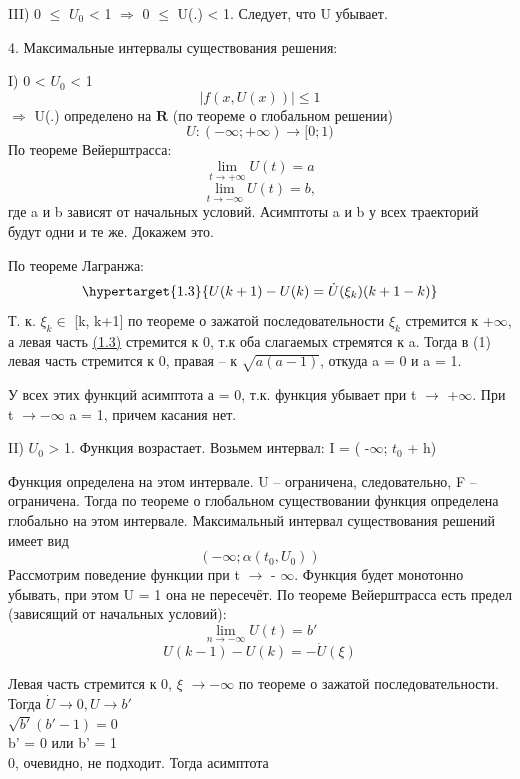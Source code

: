 \documentclass[10pt]{report}
\begin{document}
III) 0 $\leq$ $U_0$ < 1 $\Rightarrow$  0 $\leq$  U(.) < 1. Следует, что U убывает. \par

4. Максимальные интервалы существования решения:

I) 0 < $U_0$ < 1
\[ |f(x, U(x))|  \leq 1 \] $\Rightarrow$ U(.) определено на $\mathbf{R}$ (по теореме о глобальном решении)
\[ U : (-\infty; +\infty) \rightarrow [0;1) \]
По теореме Вейерштрасса:
\[
\lim_{t \to +\infty } U(t) = a
\]
\[
\lim_{t \to -\infty} U(t) = b,
\]
где a и b зависят от начальных условий. Асимптоты a и b у всех траекторий будут одни и те же. Докажем это.
\par
По теореме Лагранжа:
\begin{equation}
\hypertarget{1.3}{ U(k+1)-U(k) = \dot{U}(\xi_k)(k+1-k)}
\end{equation}
Т. к.  $\xi_k \in$ [k, k+1] по теореме о зажатой последовательности $\xi_k$ стремится к +$\infty$, а левая часть \hyperlink{1.3}{(1.3)} стремится к 0, т.к оба слагаемых стремятся к a. Тогда в (1) левая часть стремится к 0, правая -- к $\sqrt{a(a-1)}$, откуда 
\newline a = 0 и a = 1.

У всех этих функций асимптота а = 0, т.к. функция убывает при t $\rightarrow$ +$\infty$.
\newline При t $\rightarrow -\infty$    a = 1, причем касания нет.

II) $U_0$ > 1. Функция возрастает. Возьмем интервал:
\newline
I = ( -$\infty$; $t_0$ + h)

Функция определена на этом интервале. U -- ограничена, следовательно, F -- ограничена. Тогда по теореме о глобальном существовании функция определена глобально на этом интервале. Максимальный интервал существования решений имеет вид
\[
( - \infty; \alpha(t_0, U_0))
\]
Рассмотрим поведение функции при t $\rightarrow$ - $\infty$. Функция будет монотонно убывать, при этом U = 1 она не пересечёт. По теореме Вейерштрасса есть предел (зависящий от начальных условий):
\[
\lim_{n \to -\infty } U(t) = b'
\]
\[
U(k-1)-U(k) = -\dot{U}(\xi)
\]

Левая часть стремится к 0, $\xi$ $\rightarrow - \infty$ по теореме о зажатой последовательности. Тогда $\dot{U} \rightarrow 0, U \rightarrow b'$\\
$\sqrt{b'} (b'-1) = 0$\\
b' = 0 или b' = 1\\
0, очевидно, не подходит. Тогда асимптота 
\end{document}
